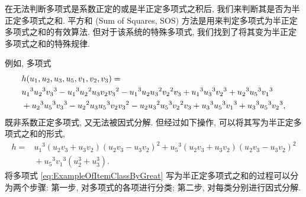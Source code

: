 \documentclass[10pt,a4paper]{ctexart}
\begin{document}
在无法判断多项式是系数正定的或是半正定多项式之积后, 我们来判断其是否为半正定多项式之和. 平方和 (Sum of Squares, SOS) 方法是用来判定多项式为半正定多项式之和的有效算法. 但对于该系统的特殊多项式, 我们找到了将其变为半正定多项式之和的特殊规律.

例如, 多项式
\begin{align}
  & h(u_{{1}}, u_{{2}}, u_{{3}}, u_{{5}}, v_{{1}}, v_{{2}}, v_{{3}}) = {}\notag\\
  & {u_{{1}}}^{3}{u_{{2}}}^{3}{v_{{3}}}^{3} - {u_{{1}}}^{3}{u_{{2}}}^{2}u_{{3}}v_{{2}}{v_{{3}}}^{2} - {u_{{1}}}^{3}u_{{2}}{u_{{3}}}^{2}{v_{{2}}}^{2}v_{{3}} + {u_{{1}}}^{3}{u_{{3}}}^{3}{v_{{2}}}^{3} + {u_{{2}}}^{3}{u_{{5}}}^{3}{v_{{1}}}^{3}\notag\\
  & {} + {u_{{2}}}^{3}{u_{{5}}}^{3}{v_{{3}}}^{3} - {u_{{2}}}^{2}u_{{3}}{u_{{5}}}^{3}v_{{2}}{v_{{3}}}^{2} - u_{{2}}{u_{{3}}}^{2}{u_{{5}}}^{3}{v_{{2}}}^{2}v_{{3}} + {u_{{3}}}^{3}{u_{{5}}}^{3}{v_{{1}}}^{3} + {u_{{3}}}^{3}{u_{{5}}}^{3}{v_{{2}}}^{3},\label{eq:ExampleOfItemClassByGreat}
\end{align}
既非系数正定多项式, 又无法被因式分解. 但经过如下操作, 可以将其写为半正定多项式之和的形式,
\begin{align*}
  h = {} & {u_{{1}}}^{3} \left( u_{{2}}v_{{3}} + u_{{3}}v_{{2}} \right)  \left( u_{{2}}v_{{3}} - u_{{3}}v_{{2}} \right) ^{2} + {u_{{5}}}^{3} \left( u_{{2}}v_{{3}} + u_{{3}}v_{{2}} \right)  \left( u_{{2}}v_{{3}} - u_{{3}}v_{{2}} \right) ^{2}\\
  & {} + {u_{{5}}}^{3}{v_{{1}}}^{3} \left( u_{{2}}^{3} + u_{{3}}^{3} \right).
\end{align*}
将多项式 \eqref{eq:ExampleOfItemClassByGreat} 写为半正定多项式之和的过程可以分为两个步骤: 第一步, 对多项式的各项进行分类; 第二步, 对每类分别进行因式分解.
\end{document}

